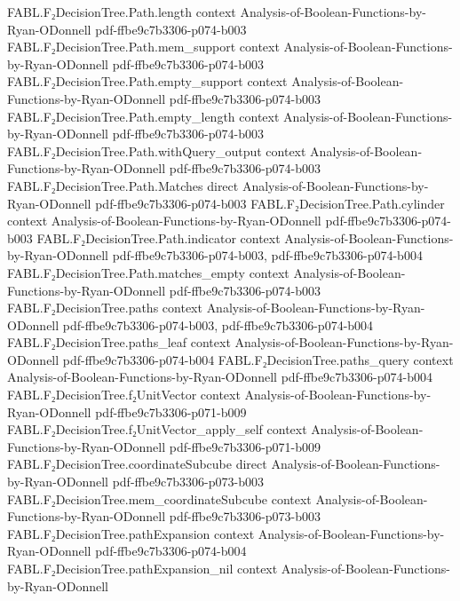 \begin{theorem}
\proofstep
  {FABL.F₂DecisionTree.Path.length}
  {context}
  {Analysis-of-Boolean-Functions-by-Ryan-ODonnell}
  {pdf-ffbe9c7b3306-p074-b003}
\proofstep
  {FABL.F₂DecisionTree.Path.mem_support}
  {context}
  {Analysis-of-Boolean-Functions-by-Ryan-ODonnell}
  {pdf-ffbe9c7b3306-p074-b003}
\proofstep
  {FABL.F₂DecisionTree.Path.empty_support}
  {context}
  {Analysis-of-Boolean-Functions-by-Ryan-ODonnell}
  {pdf-ffbe9c7b3306-p074-b003}
\proofstep
  {FABL.F₂DecisionTree.Path.empty_length}
  {context}
  {Analysis-of-Boolean-Functions-by-Ryan-ODonnell}
  {pdf-ffbe9c7b3306-p074-b003}
\proofstep
  {FABL.F₂DecisionTree.Path.withQuery_output}
  {context}
  {Analysis-of-Boolean-Functions-by-Ryan-ODonnell}
  {pdf-ffbe9c7b3306-p074-b003}
\proofstep
  {FABL.F₂DecisionTree.Path.Matches}
  {direct}
  {Analysis-of-Boolean-Functions-by-Ryan-ODonnell}
  {pdf-ffbe9c7b3306-p074-b003}
\proofstep
  {FABL.F₂DecisionTree.Path.cylinder}
  {context}
  {Analysis-of-Boolean-Functions-by-Ryan-ODonnell}
  {pdf-ffbe9c7b3306-p074-b003}
\proofstep
  {FABL.F₂DecisionTree.Path.indicator}
  {context}
  {Analysis-of-Boolean-Functions-by-Ryan-ODonnell}
  {pdf-ffbe9c7b3306-p074-b003,
    pdf-ffbe9c7b3306-p074-b004}
\proofstep
  {FABL.F₂DecisionTree.Path.matches_empty}
  {context}
  {Analysis-of-Boolean-Functions-by-Ryan-ODonnell}
  {pdf-ffbe9c7b3306-p074-b003}
\proofstep
  {FABL.F₂DecisionTree.paths}
  {context}
  {Analysis-of-Boolean-Functions-by-Ryan-ODonnell}
  {pdf-ffbe9c7b3306-p074-b003,
    pdf-ffbe9c7b3306-p074-b004}
\proofstep
  {FABL.F₂DecisionTree.paths_leaf}
  {context}
  {Analysis-of-Boolean-Functions-by-Ryan-ODonnell}
  {pdf-ffbe9c7b3306-p074-b004}
\proofstep
  {FABL.F₂DecisionTree.paths_query}
  {context}
  {Analysis-of-Boolean-Functions-by-Ryan-ODonnell}
  {pdf-ffbe9c7b3306-p074-b004}
\proofstep
  {FABL.F₂DecisionTree.f₂UnitVector}
  {context}
  {Analysis-of-Boolean-Functions-by-Ryan-ODonnell}
  {pdf-ffbe9c7b3306-p071-b009}
\proofstep
  {FABL.F₂DecisionTree.f₂UnitVector_apply_self}
  {context}
  {Analysis-of-Boolean-Functions-by-Ryan-ODonnell}
  {pdf-ffbe9c7b3306-p071-b009}
\proofstep
  {FABL.F₂DecisionTree.coordinateSubcube}
  {direct}
  {Analysis-of-Boolean-Functions-by-Ryan-ODonnell}
  {pdf-ffbe9c7b3306-p073-b003}
\proofstep
  {FABL.F₂DecisionTree.mem_coordinateSubcube}
  {context}
  {Analysis-of-Boolean-Functions-by-Ryan-ODonnell}
  {pdf-ffbe9c7b3306-p073-b003}
\proofstep
  {FABL.F₂DecisionTree.pathExpansion}
  {context}
  {Analysis-of-Boolean-Functions-by-Ryan-ODonnell}
  {pdf-ffbe9c7b3306-p074-b004}
\proofstep
  {FABL.F₂DecisionTree.pathExpansion_nil}
  {context}
  {Analysis-of-Boolean-Functions-by-Ryan-ODonnell}

\end{theorem}
